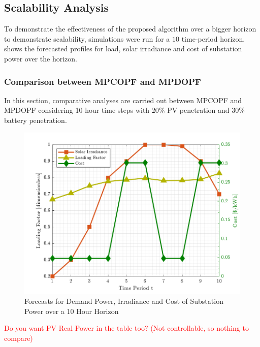 \documentclass[../../outputs/main.tex]{subfiles}
\begin{document}
\subsection{Scalability Analysis}

To demonstrate the effectiveness of the proposed algorithm over a bigger horizon to demonstrate scalability, simulations were run for a $10$ time-period horizon.  shows the forecasted profiles for load, solar irradiance and cost of substation power over the horizon. 

\subsubsection{Comparison between MPCOPF and MPDOPF}
In this section, comparative analyses are carried out between MPCOPF and MPDOPF considering 10-hour time steps with $20\%$ PV penetration and $30\%$ battery penetration.

\begin{figure}[h!]
    \centering
    \includegraphics[height=0.25\textheight]{../figures/T10-inputCurves/InputCurves_Horizon_10.png}
    \caption{Forecasts for Demand Power, Irradiance and Cost of Substation Power over a 10 Hour Horizon}
    \label{fig:inputCurve-10}
\end{figure}

\textcolor{red}{Do you want PV Real Power in the table too? (Not controllable, so nothing to compare)}
\end{document}
